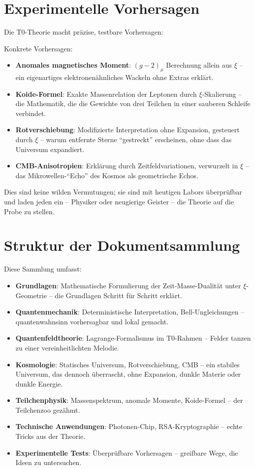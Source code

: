 	\section{Experimentelle Vorhersagen}
	Die T0-Theorie macht präzise, testbare Vorhersagen:
	
	\begin{foundation}
		Konkrete Vorhersagen:
		\begin{itemize}
			\item \textbf{Anomales magnetisches Moment}: $(g-2)_\mu$ Berechnung allein aus $\xi$ – ein eigenartiges elektronenähnliches Wackeln ohne Extras erklärt.
			\item \textbf{Koide-Formel}: Exakte Massenrelation der Leptonen durch $\xi$-Skalierung – die Mathematik, die die Gewichte von drei Teilchen in einer sauberen Schleife verbindet.
			\item \textbf{Rotverschiebung}: Modifizierte Interpretation ohne Expansion, gesteuert durch $\xi$ – warum entfernte Sterne ``gestreckt'' erscheinen, ohne dass das Universum expandiert.
			\item \textbf{CMB-Anisotropien}: Erklärung durch Zeitfeldvariationen, verwurzelt in $\xi$ – das Mikrowellen-``Echo'' des Kosmos als geometrische Echos.
		\end{itemize}
	\end{foundation}
	
	Dies sind keine wilden Vermutungen; sie sind mit heutigen Labors überprüfbar und laden jeden ein – Physiker oder neugierige Geister – die Theorie auf die Probe zu stellen.
	
	\section{Struktur der Dokumentsammlung}
	Diese Sammlung umfasst:
	\begin{itemize}
		\item \textbf{Grundlagen}: Mathematische Formulierung der Zeit-Masse-Dualität unter $\xi$-Geometrie – die Grundlagen Schritt für Schritt erklärt.
		\item \textbf{Quantenmechanik}: Deterministische Interpretation, Bell-Ungleichungen – quantenwahnsinn vorhersagbar und lokal gemacht.
		\item \textbf{Quantenfeldtheorie}: Lagrange-Formalismus im T0-Rahmen – Felder tanzen zu einer vereinheitlichten Melodie.
		\item \textbf{Kosmologie}: Statisches Universum, Rotverschiebung, CMB – ein stabiles Universum, das dennoch überrascht, ohne Expansion, dunkle Materie oder dunkle Energie.
		\item \textbf{Teilchenphysik}: Massenspektrum, anomale Momente, Koide-Formel – der Teilchenzoo gezähmt.
		\item \textbf{Technische Anwendungen}: Photonen-Chip, RSA-Kryptographie – echte Tricks aus der Theorie.
		\item \textbf{Experimentelle Tests}: Überprüfbare Vorhersagen – greifbare Wege, die Ideen zu untersuchen.
	\end{itemize}
	
